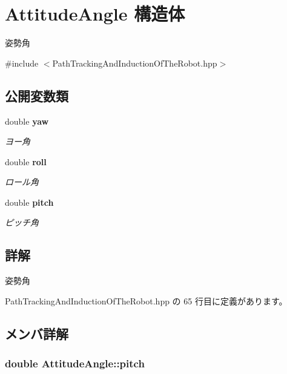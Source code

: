 \section{Attitude\-Angle 構造体}
\label{struct_attitude_angle}


姿勢角  




{\ttfamily \#include $<$Path\-Tracking\-And\-Induction\-Of\-The\-Robot.\-hpp$>$}

\subsection*{公開変数類}
\begin{DoxyCompactItemize}
\item 
double {\bf yaw}
\begin{DoxyCompactList}\small\item\em ヨー角 \end{DoxyCompactList}\item 
double {\bf roll}
\begin{DoxyCompactList}\small\item\em ロール角 \end{DoxyCompactList}\item 
double {\bf pitch}
\begin{DoxyCompactList}\small\item\em ピッチ角 \end{DoxyCompactList}\end{DoxyCompactItemize}


\subsection{詳解}
姿勢角 

 Path\-Tracking\-And\-Induction\-Of\-The\-Robot.\-hpp の 65 行目に定義があります。



\subsection{メンバ詳解}
\subsubsection[{pitch}]{\setlength{\rightskip}{0pt plus 5cm}double Attitude\-Angle\-::pitch}\label{struct_attitude_angle_ad8f6b5c2dc91fff26166d9b8516abf2c}


